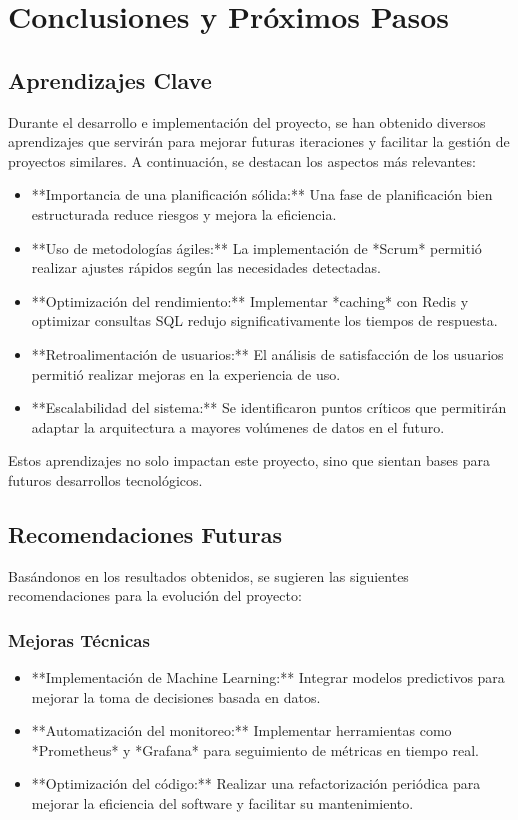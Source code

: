 \chapter{Conclusiones y Próximos Pasos}

\section{Aprendizajes Clave}

Durante el desarrollo e implementación del proyecto, se han obtenido diversos aprendizajes que servirán para mejorar futuras iteraciones y facilitar la gestión de proyectos similares. A continuación, se destacan los aspectos más relevantes:

\begin{itemize}
	\item **Importancia de una planificación sólida:** Una fase de planificación bien estructurada reduce riesgos y mejora la eficiencia.
	\item **Uso de metodologías ágiles:** La implementación de *Scrum* permitió realizar ajustes rápidos según las necesidades detectadas.
	\item **Optimización del rendimiento:** Implementar *caching* con Redis y optimizar consultas SQL redujo significativamente los tiempos de respuesta.
	\item **Retroalimentación de usuarios:** El análisis de satisfacción de los usuarios permitió realizar mejoras en la experiencia de uso.
	\item **Escalabilidad del sistema:** Se identificaron puntos críticos que permitirán adaptar la arquitectura a mayores volúmenes de datos en el futuro.
\end{itemize}

Estos aprendizajes no solo impactan este proyecto, sino que sientan bases para futuros desarrollos tecnológicos.



\section{Recomendaciones Futuras}

Basándonos en los resultados obtenidos, se sugieren las siguientes recomendaciones para la evolución del proyecto:

\subsection{Mejoras Técnicas}
\begin{itemize}
	\item **Implementación de Machine Learning:** Integrar modelos predictivos para mejorar la toma de decisiones basada en datos.
	\item **Automatización del monitoreo:** Implementar herramientas como *Prometheus* y *Grafana* para seguimiento de métricas en tiempo real.
	\item **Optimización del código:** Realizar una refactorización periódica para mejorar la eficiencia del software y facilitar su mantenimiento.
\end{itemize}

